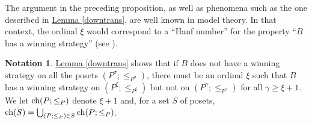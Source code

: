 \documentclass[reqno]{amsart}
\theoremstyle{definition}
\newtheorem{notation}[theorem]{Notation}
\theoremstyle{definition}
\theoremstyle{plain} %
\begin{document}
The argument in the preceding proposition, as well as phenomena such as the one described in \hyperref[downtrans]{Lemma \ref{downtrans}}, are well known in model theory. In that context, the ordinal $\xi$ would correspond to a ``Hanf number'' for the property ``$B$ has a winning strategy'' (see \cite[Ch. 4]{Baldwin2009}).
\begin{notation}
    \hyperref[downtrans]{Lemma \ref{downtrans}} shows that if $B$ does not have a winning strategy on all the posets $(P^\sigma;\leq_{P^\sigma})$, there must be an ordinal $\xi$ such that $B$ has a winning strategy on $(P^\xi;\leq_{P^\xi})$ but not on $(P^{\gamma };\leq_{P^{\gamma}})$ for all $\gamma\geq\xi+1$. We let $\textnormal{ch}(P;\leq_{P})$ denote $\xi+1$ and, for a set $S$ of posets, $\text{ch}(S)=\bigcup_{(P;\leq_{P})\in S}\textnormal{ch}(P;\leq_{P})$.
\end{notation}
\end{document}
